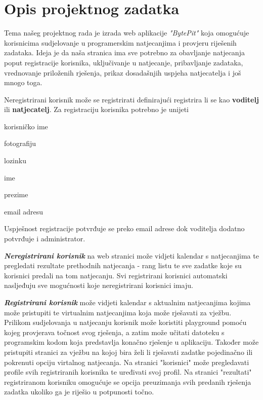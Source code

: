 \chapter{Opis projektnog zadatka}
		
		
		
		Tema našeg projektnog rada je izrada web aplikacije \textit{"BytePit"} koja omogućuje korisnicima sudjelovanje u programerskim natjecanjima i provjeru riješenih zadataka. Ideja je da naša stranica ima sve potrebno za obavljanje natjecanja poput registracije korisnika, uključivanje u natjecanje, pribavljanje zadataka, vrednovanje priloženih rješenja, prikaz dosadašnjih uspjeha natjecatelja i još mnogo toga.
	
		Neregistrirani korisnik može se registrirati definirajući registrira li se kao \textbf{voditelj} ili \textbf{natjecatelj}.
		Za registraciju korisnika potrebno je  unijeti \begin{packed_item}
			\item korisničko ime
			\item fotografiju
			\item lozinku
			\item ime
			\item prezime
			\item email adresu
		\end{packed_item}
		Uspješnost registracije potvrđuje se preko email adrese dok  voditelja dodatno potvrđuje i administrator.
		
		\textbf{\textit{Neregistrirani korisnik}} na web stranici može vidjeti kalendar s natjecanjima te pregledati rezultate prethodnih natjecanja - rang listu te sve zadatke koje su korisnici predali na tom natjecanju. Svi registrirani korisnici automatski nasljeđuju sve mogućnosti koje neregistrirani korisnici imaju.
		
		\textbf{\textit{Registrirani korisnik}} može vidjeti kalendar s aktualnim natjecanjima kojima može pristupiti te virtualnim natjecanjima koja može rješavati za vježbu. Prilikom sudjelovanja u natjecanju korisnik može koristiti playground pomoću kojeg provjerava točnost svog rješenja, a zatim može učitati datoteku s programskim kodom koja predstavlja konačno rješenje u aplikaciju. Također može pristupiti stranici  za vježbu na kojoj bira želi li rješavati zadatke pojedinačno ili pokrenuti opciju virtalnog natjecanja. Na stranici "korisnici" može pregledavati profile svih registriranih korisnika te uređivati svoj profil. Na stranici "rezultati" registriranom korisniku omogućuje se opcija preuzimanja svih predanih rješenja zadatka ukoliko ga je riješio u potpunosti točno. 
		
